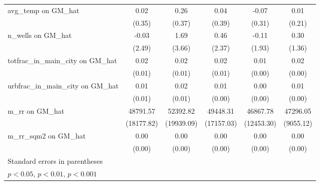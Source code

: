 {\begin{tabular}{l*{5}{c}}
\addlinespace
avg\_temp on GM\_hat&     0.02         &     0.26         &     0.04         &    -0.07         &     0.01         \\
                &   (0.35)         &   (0.37)         &   (0.39)         &   (0.31)         &   (0.21)         \\
\addlinespace
n\_wells on GM\_hat&    -0.03         &     1.69         &     0.46         &    -0.11         &     0.30         \\
                &   (2.49)         &   (3.66)         &   (2.37)         &   (1.93)         &   (1.36)         \\
\addlinespace
totfrac\_in\_main\_city on GM\_hat&     0.02\sym{***}&     0.02\sym{***}&     0.02\sym{***}&     0.01\sym{***}&     0.02\sym{***}\\
                &   (0.01)         &   (0.01)         &   (0.01)         &   (0.00)         &   (0.00)         \\
\addlinespace
urbfrac\_in\_main\_city on GM\_hat&     0.01\sym{*}  &     0.02\sym{**} &     0.01\sym{*}  &     0.00         &     0.01\sym{**} \\
                &   (0.01)         &   (0.01)         &   (0.00)         &   (0.00)         &   (0.00)         \\
\addlinespace
m\_rr on GM\_hat  & 48791.57\sym{**} & 52392.82\sym{**} & 49448.31\sym{**} & 46867.78\sym{***}& 47296.05\sym{***}\\
                &(18177.82)         &(19939.09)         &(17157.03)         &(12453.30)         &(9055.12)         \\
\addlinespace
m\_rr\_sqm2 on GM\_hat&     0.00         &     0.00         &     0.00         &     0.00\sym{*}  &     0.00\sym{**} \\
                &   (0.00)         &   (0.00)         &   (0.00)         &   (0.00)         &   (0.00)         \\
\bottomrule
\multicolumn{6}{l}{\footnotesize Standard errors in parentheses}\\
\multicolumn{6}{l}{\footnotesize \sym{*} \(p<0.05\), \sym{**} \(p<0.01\), \sym{***} \(p<0.001\)}\\
\end{tabular}
}
